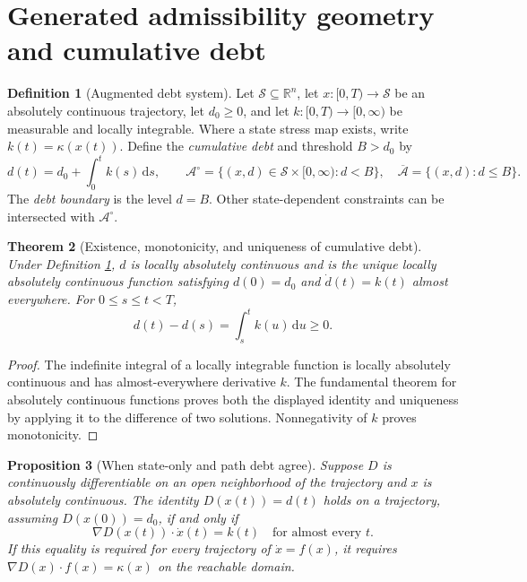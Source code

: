 \documentclass[11pt,letterpaper]{article}
\newtheorem{theorem}{Theorem}[section]
\newtheorem{proposition}[theorem]{Proposition}
\theoremstyle{definition}\newtheorem{definition}[theorem]{Definition}\newtheorem{example}[theorem]{Example}
\theoremstyle{remark}\newtheorem{remark}[theorem]{Remark}
\newcommand{\R}{\mathbb R}\newcommand{\dd}{\mathrm d}\newcommand{\ess}{\operatorname{ess}}
\begin{document}
\section{Generated admissibility geometry and cumulative debt}
\begin{definition}[Augmented debt system]\label{def:model}
Let $\mathcal S\subseteq\R^n$, let $x:[0,T)\to\mathcal S$ be an absolutely continuous trajectory, let $d_0\geq0$, and let $k:[0,T)\to[0,\infty)$ be measurable and locally integrable. Where a state stress map exists, write $k(t)=\kappa(x(t))$. Define the \emph{cumulative debt} and threshold $B> d_0$ by
\begin{equation}\label{eq:debt}
 d(t)=d_0+\int_0^t k(s)\,\dd s,\qquad
 \mathscr A^{\circ}=\{(x,d)\in\mathcal S\times[0,\infty):d<B\},\quad
 \overline{\mathscr A}=\{(x,d):d\leq B\}.
\end{equation}
The \emph{debt boundary} is the level $d=B$. Other state-dependent constraints can be intersected with $\mathscr A^\circ$.
\end{definition}
\begin{theorem}[Existence, monotonicity, and uniqueness of cumulative debt]\label{th:basic}
Under Definition \ref{def:model}, $d$ is locally absolutely continuous and is the unique locally absolutely continuous function satisfying $d(0)=d_0$ and $\dot d(t)=k(t)$ almost everywhere. For $0\leq s\leq t<T$,
\begin{equation}\label{eq:monotone}
d(t)-d(s)=\int_s^t k(u)\,\dd u\geq0.
\end{equation}
\end{theorem}
\begin{proof}
The indefinite integral of a locally integrable function is locally absolutely continuous and has almost-everywhere derivative $k$. The fundamental theorem for absolutely continuous functions proves both the displayed identity and uniqueness by applying it to the difference of two solutions. Nonnegativity of $k$ proves monotonicity.
\end{proof}
\begin{proposition}[When state-only and path debt agree]\label{prop:potential}
Suppose $D$ is continuously differentiable on an open neighborhood of the trajectory and $x$ is absolutely continuous. The identity $D(x(t))=d(t)$ holds on a trajectory, assuming $D(x(0))=d_0$, if and only if
\begin{equation}\label{eq:compat}
\nabla D(x(t))\cdot\dot x(t)=k(t)\quad\text{for almost every }t.
\end{equation}
If this equality is required for every trajectory of $\dot x=f(x)$, it requires $\nabla D(x)\cdot f(x)=\kappa(x)$ on the reachable domain.
\end{proposition}
\end{document}

